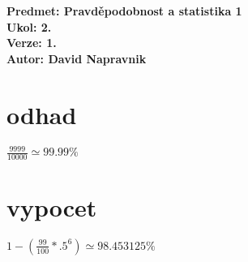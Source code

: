 \documentclass[a4paper]{article}
\begin{document}
\noindent
\textbf{Predmet: Pravděpodobnost a statistika 1}\\
\textbf{Ukol: 2.}\\
\textbf{Verze: 1.}\\
\textbf{Autor: David Napravnik}

\section*{odhad}
$\frac{9999}{10000} \simeq 99.99 \%$




\section*{vypocet}
$1-(\frac{99}{100}*.5^6) \simeq 98.453125 \%$
\end{document}
